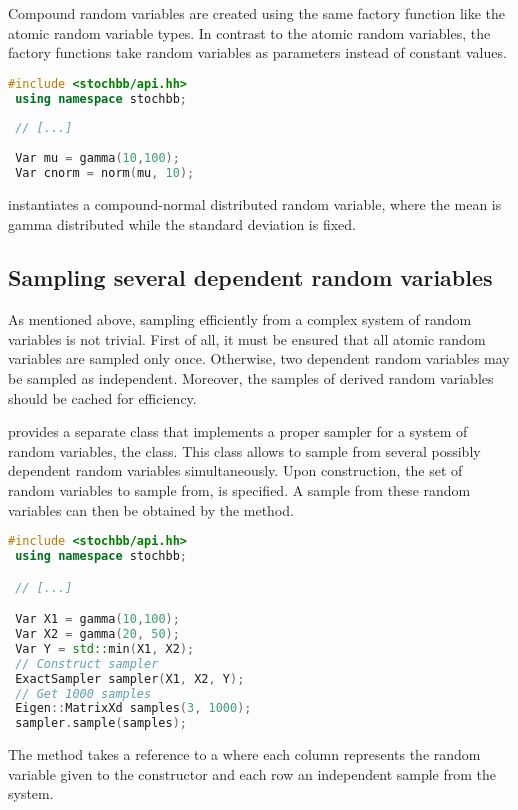 Compound random variables are created using the same factory function like the atomic random variable
types. In contrast to the atomic random variables, the factory functions take random variables as 
parameters instead of constant values.
\begin{lstlisting}[language=C++]
 #include <stochbb/api.hh>
 using namespace stochbb;
 
 // [...]
 
 Var mu = gamma(10,100);
 Var cnorm = norm(mu, 10);
\end{lstlisting}
instantiates a compound-normal distributed random variable, where the mean is gamma distributed
while the standard deviation is fixed.

\subsection{Sampling several dependent random variables}
As mentioned above, sampling efficiently from a complex system of random variables is not trivial. 
First of all, it must be ensured that all atomic random variables are sampled only once. Otherwise, two dependent
random variables may be sampled as independent. Moreover, the samples of derived random variables
should be cached for efficiency. 

 provides a separate class that implements a proper sampler for a system
of random variables, the  class. This class allows to sample
from several possibly dependent random variables simultaneously. Upon construction,
the set of random variables to sample from, is specified. A sample from these random
variables can then be obtained by the  method.
\begin{lstlisting}[language=C++]
 #include <stochbb/api.hh>
 using namespace stochbb;

 // [...]

 Var X1 = gamma(10,100);
 Var X2 = gamma(20, 50);
 Var Y = std::min(X1, X2);
 // Construct sampler
 ExactSampler sampler(X1, X2, Y);
 // Get 1000 samples
 Eigen::MatrixXd samples(3, 1000);
 sampler.sample(samples);
\end{lstlisting}

The  method takes a reference to a  where each column
represents the random variable given to the constructor and each row an independent sample from
the system.

